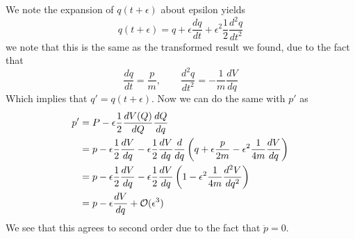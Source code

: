 \documentclass[11pt]{article}
\numberwithin{equation}{section}
\begin{document}
We note the expansion of $q(t+\epsilon)$ about epsilon yields
$$q(t+\epsilon) = q + \epsilon\frac{dq}{dt} + \epsilon^2\frac{1}{2}\frac{d^2q}{dt^2}$$
we note that this is the same as the transformed result we found, due to the fact that 
$$\frac{dq}{dt} = \frac{p}{m},\qquad \frac{d^2q}{dt^2} = -\frac{1}{m}\frac{dV}{dq}$$
Which implies that $q' = q(t+\epsilon)$. Now we can do the same with $p'$ as
\begin{align*}
p' &= P - \epsilon\frac{1}{2}\frac{dV(Q)}{dQ}\frac{dQ}{dq}\\
&= p - \epsilon\frac{1}{2}\frac{dV}{dq} - \epsilon\frac{1}{2}\frac{dV}{dq}\frac{d}{dq}\left(q + \epsilon\frac{p}{2m} - \epsilon^2\frac{1}{4m}\frac{dV}{dq}\right)\\
&= p - \epsilon\frac{1}{2}\frac{dV}{dq} - \epsilon\frac{1}{2}\frac{dV}{dq}\left(1 - \epsilon^2\frac{1}{4m}\frac{d^2V}{dq^2}\right)\\
&= p - \epsilon\frac{dV}{dq} + \mathcal{O}(\epsilon^3)
\end{align*}
We see that this agrees to second order due to the fact that $\ddot{p}=0$.

\pagebreak
\end{document}
